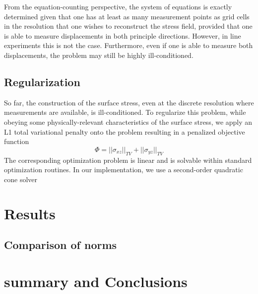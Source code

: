 \documentclass[aps,prl,reprint,twocolumn,groupedaddress,showpacs]{revtex4-1}
\begin{document}
From the equation-counting perspective, the system of equations is exactly determined given that one has at least as many measurement points as grid cells in the resolution that one wishes to reconstruct the stress field, provided that one is able to measure displacements in both principle directions. However, in line experiments this is not the case. Furthermore, even if one is able to measure both displacements, the problem may still be highly ill-conditioned.

\subsection{Regularization}

So far, the construction of the surface stress, even at the discrete
resolution where measurements are available, is ill-conditioned. To
regularize this problem, while obeying some physically-relevant
characteristics of the surface stress, we apply an L1 total
variational penalty onto the problem resulting in a penalized
objective function
%
\begin{equation}
\Phi = ||\sigma_{xz}||_{TV} +  ||\sigma_{yz}||_{TV}
\end{equation}
%
The corresponding optimization problem is linear and is solvable within standard optimization routines. In our implementation, we use a second-order 
quadratic cone solver 


\section{Results}

\subsection{Comparison of norms}
\section{summary and Conclusions}



\end{document}
